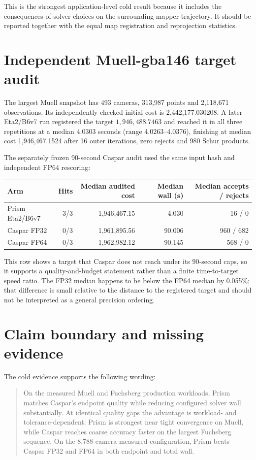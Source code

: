 \documentclass[10pt]{article}
\begin{document}
This is the strongest application-level cold result because it includes the consequences of solver choices on the surrounding mapper trajectory.  It should be reported together with the equal map registration and reprojection statistics.

\section{Independent Muell-gba146 target audit}

The largest Muell snapshot has 493 cameras, 313,987 points and 2,118,671 observations.  Its independently checked initial cost is 2,442,177.030208.  A later Eta2/B6v7 run registered the target $1,946,488.7463$ and reached it in all three repetitions at a median 4.0303 seconds (range 4.0263--4.0376), finishing at median cost 1,946,467.1524 after 16 outer iterations, zero rejects and 980 Schur products.

The separately frozen 90-second Caspar audit used the same input hash and independent FP64 rescoring:

\begin{center}
\begin{tabular}{lrrrr}
\toprule
Arm & Hits & Median audited cost & Median wall (s) & Median accepts / rejects \\
\midrule
Prism Eta2/B6v7 & 3/3 & 1,946,467.15 & 4.030 & 16 / 0 \\
Caspar FP32 & 0/3 & 1,961,895.56 & 90.006 & 960 / 682 \\
Caspar FP64 & 0/3 & 1,962,982.12 & 90.145 & 568 / 0 \\
\bottomrule
\end{tabular}
\end{center}

This row shows a target that Caspar does not reach under its 90-second caps, so it supports a quality-and-budget statement rather than a finite time-to-target speed ratio.  The FP32 median happens to be below the FP64 median by 0.055\%; that difference is small relative to the distance to the registered target and should not be interpreted as a general precision ordering.

\section{Claim boundary and missing evidence}

The cold evidence supports the following wording:

\begin{quote}
On the measured Muell and Fuchsberg production workloads, Prism matches Caspar's endpoint quality while reducing configured solver wall substantially.  At identical quality gaps the advantage is workload- and tolerance-dependent: Prism is strongest near tight convergence on Muell, while Caspar reaches coarse accuracy faster on the largest Fuchsberg sequence.  On the 8,788-camera measured configuration, Prism beats Caspar FP32 and FP64 in both endpoint and total wall.
\end{quote}
\end{document}
